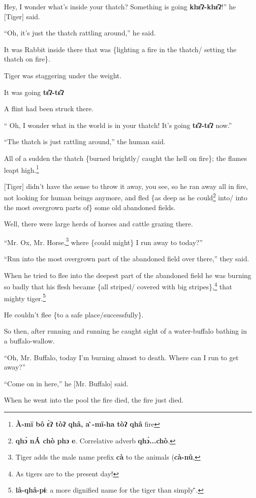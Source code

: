 {Hey, I wonder what's inside your thatch? Something is going \textbf{khɛ̂ʔ-khɛ̂ʔ}!''
he [Tiger] said.

``Oh, it's just the thatch rattling around,'' he said.

It was Rabbit inside there that was \{lighting a fire in the thatch/ setting the
thatch on fire\}.

Tiger was staggering under the weight.

It was going \textbf{tɛ̂ʔ-tɛ̂ʔ}

A flint had been struck there.

`` Oh, I wonder what in the world is in your thatch! It's going \textbf{tɛ̂ʔ-tɛ̂ʔ}
now.''

``The thatch is just rattling around,'' the human said.

All of a sudden the thatch \{burned brightly/ caught the hell on fire\}; the flames
leapt high.\footnote{\textbf{ À-mī  bô ɛ̀ʔ  tòʔ   qhâ, a 	̀-mī-ha tòʔ qhâ} fire}

[Tiger] didn't have the sense to throw it away, you see, so he ran away all in
fire, not looking for human beings anymore, and fled \{as deep as he could\footnote{\textbf{ qhɔ̀ nÁ chò phɔ e}. Correlative adverb \textbf{qhɔ̀...chò}.}
into/ into the most overgrown parts of\} some old abandoned fields.

Well, there were large herds of horses and cattle grazing there.

``Mr. Ox, Mr. Horse,\footnote{Tiger adds the male name prefix \textbf{cà} to the animals (\textbf{cà-nû},} where \{could might\} I run away to today?''

``Run into the most overgrown part of the abandoned field over there,'' they said.

When he tried to flee into the deepest part of the abandoned field he was burning
so badly that his flesh became \{all striped/ covered with big stripes\},\footnote{As tigers are to the present day!} that
mighty tiger.\footnote{\textbf{lâ-qhâ-pɨ}: a more dignified name for the tiger than simply\textbf{ ̂}.}

He couldn't flee \{to a safe place/successfully\}.

So then, after running and running he caught sight of a water-buffalo bathing in
a buffalo-wallow.

``Oh, Mr. Buffalo, today I'm burning almost to death. Where can I run to get away?''

``Come on in here,'' he [Mr. Buffalo] said.

When he went into the pool the fire died, the fire just died.

}
